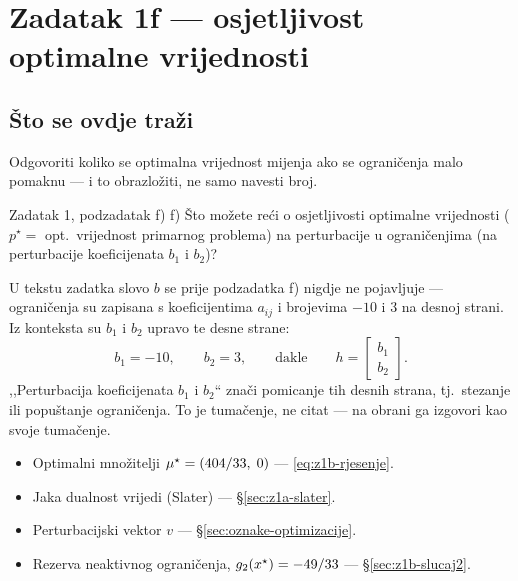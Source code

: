\chapter{Zadatak 1f --- osjetljivost optimalne vrijednosti}
\label{ch:z1-osjetljivost}

\section{Što se ovdje traži}

Odgovoriti koliko se optimalna vrijednost mijenja ako se ograničenja malo
pomaknu --- i to obrazložiti, ne samo navesti broj.

\begin{zadatak}{Zadatak 1, podzadatak f)}
f) Što možete reći o osjetljivosti optimalne vrijednosti ($p^\star =$ opt.\
vrijednost primarnog problema) na perturbacije u ograničenjima (na perturbacije
koeficijenata $b_1$ i $b_2$)?
\end{zadatak}

\begin{zamka}
U tekstu zadatka slovo $b$ se prije podzadatka f) nigdje ne pojavljuje ---
ograničenja su zapisana s koeficijentima $a_{ij}$ i brojevima $-10$ i $3$ na
desnoj strani. Iz konteksta su $b_1$ i $b_2$ upravo te desne strane:
\begin{equation}
b_1 = -10, \qquad b_2 = 3, \qquad\text{dakle}\qquad h = \begin{bmatrix} b_1 \\ b_2 \end{bmatrix}.
\end{equation}
,,Perturbacija koeficijenata $b_1$ i $b_2$`` znači pomicanje tih desnih strana,
tj.\ stezanje ili popuštanje ograničenja. To je tumačenje, ne citat --- na
obrani ga izgovori kao svoje tumačenje.
\end{zamka}

\begin{predznanje}
\begin{itemize}[nosep,leftmargin=*]
  \item Optimalni množitelji $\mu^{\star} = (404/33,\; 0)$ --- \eqref{eq:z1b-rjesenje}.
  \item Jaka dualnost vrijedi (Slater) --- \S\ref{sec:z1a-slater}.
  \item Perturbacijski vektor $v$ --- \S\ref{sec:oznake-optimizacije}.
  \item Rezerva neaktivnog ograničenja, $g_2(x^{\star}) = -49/33$ --- \S\ref{sec:z1b-slucaj2}.
\end{itemize}
\end{predznanje}

